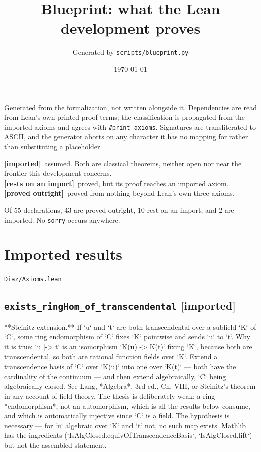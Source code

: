 \documentclass[11pt,a4paper]{article}
\title{Blueprint: what the Lean development proves}
\author{Generated by \texttt{scripts/blueprint.py}}\date{\today}
\newcommand{\tagax}{\textcolor{axc}{\textbf{[imported]}}}
\newcommand{\tagon}{\textcolor{onaxc}{\textbf{[rests on an import]}}}
\newcommand{\tagpr}{\textcolor{provedc}{\textbf{[proved outright]}}}
\begin{document}
\maketitle

\noindent
Generated from the formalization, not written alongside it. Dependencies
are read from Lean's own printed proof terms; the classification is
propagated from the imported axioms and agrees with \verb|#print axioms|.
Signatures are transliterated to ASCII, and the generator aborts on any
character it has no mapping for rather than substituting a placeholder.

\medskip\noindent
\tagax\ assumed. Both are classical theorems, neither open nor near the
frontier this development concerns.\\
\tagon\ proved, but its proof reaches an imported axiom.\\
\tagpr\ proved from nothing beyond Lean's own three axioms.

\medskip\noindent
Of 55 declarations, 43 are proved outright, 10 rest on an
import, and 2 are imported. No \verb|sorry| occurs anywhere.


\section{Imported results}
\noindent\texttt{Diaz/Axioms.lean}


\subsection*{\texttt{exists\_ringHom\_of\_transcendental} \hfill \tagax}

**Steinitz extension.** If `u` and `t` are both transcendental over a subfield `K` of `C`, some ring endomorphism of `C` fixes `K` pointwise and sends `u` to `t`. Why it is true: `u |-> t` is an isomorphism `K(u) -> K(t)` fixing `K`, because both are transcendental, so both are rational function fields over `K`. Extend a transcendence basis of `C` over `K(u)` into one over `K(t)` --- both have the cardinality of the continuum --- and then extend algebraically, `C` being algebraically closed. See Lang, *Algebra*, 3rd ed., Ch. VIII, or Steinitz's theorem in any account of field theory. The thesis is deliberately weak: a ring *endomorphism*, not an automorphism, which is all the results below consume, and which is automatically injective since `C` is a field. The hypothesis is necessary --- for `u` algebraic over `K` and `t` not, no such map exists. Mathlib has the ingredients (`IsAlgClosed.equivOfTranscendenceBasis`, `IsAlgClosed.lift`) but not the assembled statement.
\end{document}
